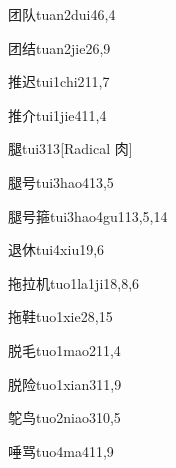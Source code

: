 \begin{verbete}{团队}{tuan2dui4}{6,4}
\end{verbete}

\begin{verbete}{团结}{tuan2jie2}{6,9}
\end{verbete}

\begin{verbete}{推迟}{tui1chi2}{11,7}
\end{verbete}

\begin{verbete}{推介}{tui1jie4}{11,4}
\end{verbete}

\begin{verbete}{腿}{tui3}{13}[Radical 肉]
\end{verbete}

\begin{verbete}{腿号}{tui3hao4}{13,5}
\end{verbete}

\begin{verbete}{腿号箍}{tui3hao4gu1}{13,5,14}
\end{verbete}

\begin{verbete}{退休}{tui4xiu1}{9,6}
\end{verbete}

\begin{verbete}{拖拉机}{tuo1la1ji1}{8,8,6}
\end{verbete}

\begin{verbete}{拖鞋}{tuo1xie2}{8,15}
\end{verbete}

\begin{verbete}{脱毛}{tuo1mao2}{11,4}
\end{verbete}

\begin{verbete}{脱险}{tuo1xian3}{11,9}
\end{verbete}

\begin{verbete}{鸵鸟}{tuo2niao3}{10,5}
\end{verbete}

\begin{verbete}{唾骂}{tuo4ma4}{11,9}
\end{verbete}


